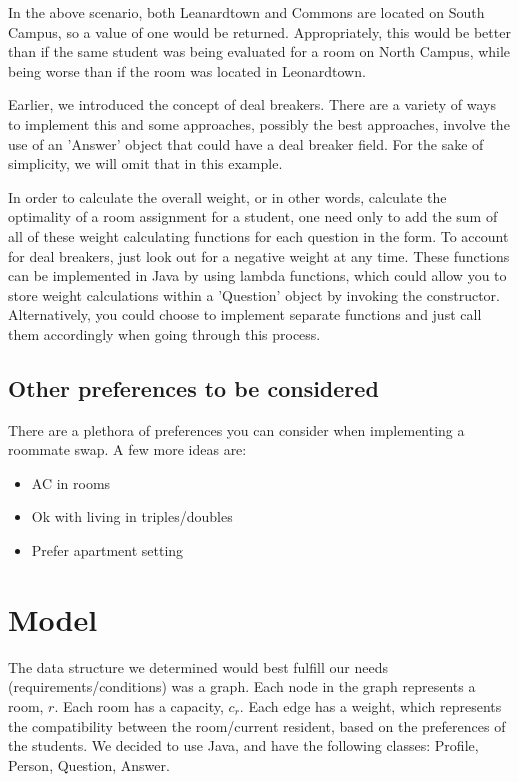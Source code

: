 \documentclass[12pt]{article}
\begin{document}

In the above scenario, both Leanardtown and Commons are located on South Campus, so a value of one would be returned. Appropriately, this would be better than if the same student was being evaluated for a room on North Campus, while being worse than if the room was located in Leonardtown. 

Earlier, we introduced the concept of deal breakers. There are a variety of ways to implement this and some approaches, possibly the best approaches, involve the use of an 'Answer' object that could have a deal breaker field. For the sake of simplicity, we will omit that in this example.


In order to calculate the overall weight, or in other words, calculate the optimality of a room assignment for a student, one need only to add the sum of all of these weight calculating functions for each question in the form. To account for deal breakers, just look out for a negative weight at any time. These functions can be implemented in Java by using lambda functions, which could allow you to store weight calculations within a 'Question' object by invoking the constructor. Alternatively, you could choose to implement separate functions and just call them accordingly when going through this process.

\subsection{Other preferences to be considered}
There are a plethora of preferences you can consider when implementing a roommate swap. A few more ideas are:
\begin{itemize}[noitemsep]
\item AC in rooms
\item Ok with living in triples/doubles 
\item Prefer apartment setting
\end{itemize}

\section{Model}

The data structure we determined would best fulfill our needs (requirements/conditions) was a graph. Each node in the graph represents a room, $r$. Each room has a capacity, $c_r$. Each edge has a weight, which represents the compatibility between the room/current resident, based on the preferences of the students. We decided to use Java, and have the following classes: Profile, Person, Question, Answer.
\end{document}
